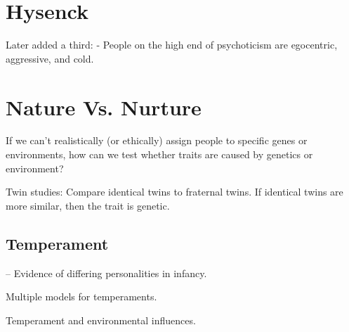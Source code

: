 \section{Hysenck}

\begin{coloredlist}
    \item {}
    \item {}
    \item Later added a third:  - People on the high end of psychoticism are egocentric, aggressive, and cold.
\end{coloredlist}

\section{Nature Vs. Nurture}

\begin{coloredlist}
    \item If we can't realistically (or ethically) assign people to specific genes or environments, how can we test whether traits are caused by genetics or environment?
    \item Twin studies: Compare identical twins to fraternal twins. If identical twins are more similar, then the trait is genetic.
\end{coloredlist}

\subsection{Temperament}

\begin{coloredlist}
    \item {} -- Evidence of differing personalities in infancy.
    \begin{coloredlist}
        \item Multiple models for temperaments.
        \item Temperament and environmental influences.
    \end{coloredlist}
\end{coloredlist}
